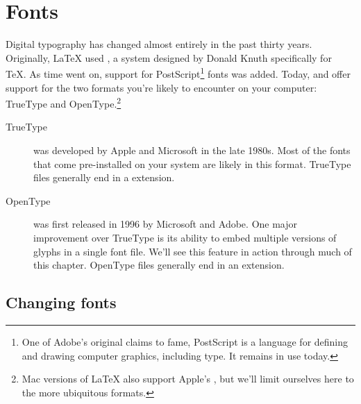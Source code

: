\chapter{Fonts}
\label{fonts}

Digital typography has changed almost entirely in the past thirty years.
Originally, \LaTeX{} used \MF,
a system designed by Donald Knuth specifically for \TeX{}.
As time went on, support for PostScript\footnote{One of
Adobe's original claims to fame,
PostScript is a language for defining and drawing computer graphics,
including type. It remains in use today.} fonts was added.
Today, \LuaLaTeX{} and \XeLaTeX{} offer support for the two formats you're
likely to encounter on your computer:
TrueType and OpenType.\punckern\footnote{Mac versions of \LaTeX{} also support
Apple's , but we'll limit ourselves here to the more ubiquitous
formats.}

\begin{description}
\item[TrueType] was developed by Apple and Microsoft in the late 1980s.
    Most of the fonts that come pre-installed on your system are likely
    in this format.
    TrueType files generally end in a  extension.
\item[OpenType] was first released in 1996 by Microsoft and Adobe.
    One major improvement over TrueType is its ability to embed
    multiple versions of glyphs in a single font file.
    We'll see this feature in action through much of this chapter.
    OpenType files generally end in an  extension.
\end{description}

\section{Changing fonts}

